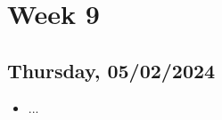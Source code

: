 \newpage
\section{Week 9}
\subsection*{Thursday, 05/02/2024}
\begin{itemize}
    \item ...
\end{itemize}

